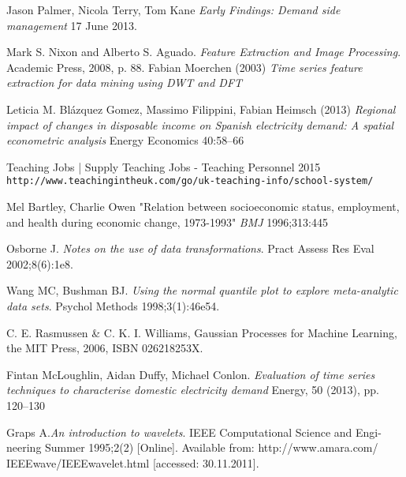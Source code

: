 \documentclass[12pt,a4paper]{report}
\begin{document}
\begin{thebibliography}{9}
Jason Palmer, Nicola Terry, Tom Kane \textit{Early Findings: Demand side management} 17 June 2013.

Mark S. Nixon and Alberto S. Aguado. \textit{Feature Extraction and Image Processing}. Academic Press, 2008, p. 88.
 Fabian Moerchen (2003) \textit{Time series feature extraction for data mining using DWT and DFT}

 Leticia M. Blázquez Gomez, Massimo Filippini, Fabian Heimsch (2013) \textit{Regional impact of changes in disposable income on Spanish electricity demand: A spatial econometric analysis} Energy Economics 40:58–66

 Teaching Jobs | Supply Teaching Jobs - Teaching Personnel 2015 \texttt{http://www.teachingintheuk.com/go/uk-teaching-info/school-system/}

 Mel Bartley, Charlie Owen "Relation between socioeconomic status, employment, and health during economic change, 1973-1993" \textit{BMJ} 1996;313:445

 Osborne J. \textit{Notes on the use of data transformations}. Pract Assess Res Eval 2002;8(6):1e8.

 Wang MC, Bushman BJ. \textit{Using the normal quantile plot to explore meta-analytic data sets}. Psychol Methods 1998;3(1):46e54.

 C. E. Rasmussen \& C. K. I. Williams, Gaussian Processes for Machine Learning, the MIT Press, 2006,
ISBN 026218253X.

 Fintan McLoughlin, Aidan Duffy, Michael Conlon. \textit{Evaluation of time series techniques to characterise domestic electricity demand} Energy, 50 (2013), pp. 120–130

 Graps A.\textit{An introduction to wavelets}. IEEE Computational Science and Engi- neering Summer 1995;2(2) [Online]. Available from: http://www.amara.com/ IEEEwave/IEEEwavelet.html [accessed: 30.11.2011].

\end{thebibliography}
\end{document}
